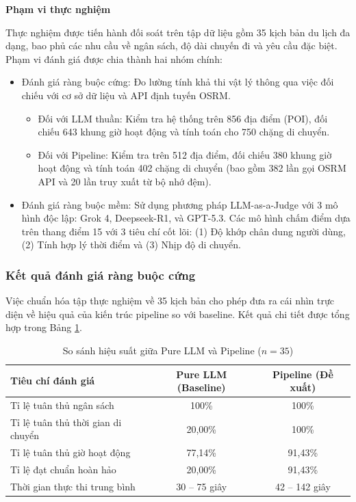 \vspace{0.5cm}
\textbf{Phạm vi thực nghiệm} 

Thực nghiệm được tiến hành đối soát trên tập dữ liệu gồm 35 kịch bản du lịch đa dạng, bao phủ các nhu cầu về ngân sách, độ dài chuyến đi và yêu cầu đặc biệt. Phạm vi đánh giá được chia thành hai nhóm chính:

\begin{itemize}
    \item Đánh giá ràng buộc cứng: Đo lường tính khả thi vật lý thông qua việc đối chiếu với cơ sở dữ liệu và API định tuyến OSRM. 
    \begin{itemize}
        \item Đối với LLM thuần: Kiểm tra hệ thống trên 856 địa điểm (POI), đối chiếu 643 khung giờ hoạt động và tính toán cho 750 chặng di chuyển.
        \item Đối với Pipeline: Kiểm tra trên 512 địa điểm, đối chiếu 380 khung giờ hoạt động và tính toán 402 chặng di chuyển (bao gồm 382 lần gọi OSRM API và 20 lần truy xuất từ bộ nhớ đệm).
    \end{itemize}
    
    \item Đánh giá ràng buộc mềm: Sử dụng phương pháp LLM-as-a-Judge với 3 mô hình độc lập: Grok 4, Deepseek-R1, và GPT-5.3. Các mô hình chấm điểm dựa trên thang điểm 15 với 3 tiêu chí cốt lõi: (1) Độ khớp chân dung người dùng, (2) Tính hợp lý thời điểm và (3) Nhịp độ di chuyển.
\end{itemize}

\subsubsection{Kết quả đánh giá ràng buộc cứng}
Việc chuẩn hóa tập thực nghiệm về 35 kịch bản cho phép đưa ra cái nhìn trực diện về hiệu quả của kiến trúc pipeline so với baseline. Kết quả chi tiết được tổng hợp trong Bảng \ref{tab:hard_constraints_comparison}.

\begin{table}[htbp]
\centering
\caption{So sánh hiệu suất giữa Pure LLM và Pipeline ($n=35$)}
\label{tab:hard_constraints_comparison}
\begin{tabular}{|l|c|c|}
\hline
\textbf{Tiêu chí đánh giá} & \textbf{Pure LLM (Baseline)} & \textbf{Pipeline (Đề xuất)} \\ \hline
Tỉ lệ tuân thủ ngân sách & 100\% & 100\% \\ \hline
Tỉ lệ tuân thủ thời gian di chuyển & 20,00\% & 100\% \\ \hline
Tỉ lệ tuân thủ giờ hoạt động & 77,14\% & 91,43\% \\ \hline
Tỉ lệ đạt chuẩn hoàn hảo & 20,00\% & 91,43\% \\ \hline
Thời gian thực thi trung bình & 30 -- 75 giây & 42 -- 142 giây \\ \hline
\end{tabular}
\end{table}

